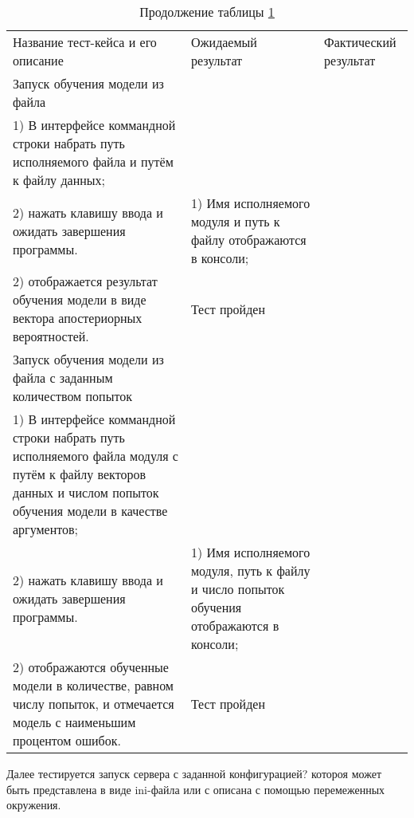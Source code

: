 \begin{longtable}[l]{| >{\raggedright}p{}
                     | >{\raggedright}p{}
                     | >{\raggedright\arraybackslash}p{}|}
  \caption{Тестирование программы построения компактной модели PUF}
  \label{table:testing:bayes}\\
  \endfirsthead
  \caption*{Продолжение таблицы \ref{table:testing:bayes}}\\
  \endhead

  \hline
       Название тест-кейса и его описание & Ожидаемый результат & Фактический результат \\
   \hline
   Запуск обучения модели из файла \\
   1) В интерфейсе коммандной строки набрать путь исполняемого файла и путём к файлу данных; \\
   2) нажать клавишу ввода и ожидать завершения программы.
   &
   1) Имя исполняемого модуля и путь к файлу отображаются в консоли; \\
   2) отображается результат обучения модели в виде вектора апостериорных вероятностей.
   &
   Тест пройден \\ \hline

   Запуск обучения модели из файла с заданным количеством попыток \\
   1) В интерфейсе коммандной строки набрать путь исполняемого файла модуля с путём к файлу векторов данных и числом попыток обучения модели в качестве аргументов; \\
   2) нажать клавишу ввода и ожидать завершения программы.
   &
   1) Имя исполняемого модуля, путь к файлу и число попыток обучения отображаются в консоли; \\
   2) отображаются обученные модели в количестве, равном числу попыток, и отмечается модель с наименьшим процентом ошибок.
   &
   Тест пройден \\

   \hline
\end{longtable}

Далее тестируется запуск сервера с заданной конфигурацией? котороя может быть представлена в виде ini-файла или с описана с помощью перемеженных окружения.
\clearpage

